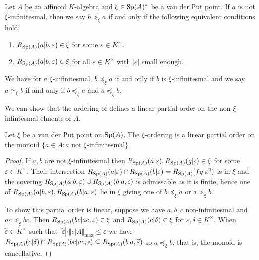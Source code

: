 \begin{definition}[$\xi$-Ordering]\label{def: xi-ordering}
    Let $A$ be an affinoid $K$-algebra and $\xi\in\mathrm{Sp}(A)^{*}$ be a van der Put point. If $a$ is not $\xi$-infinitesmal, then we say $b\preceq_{\xi}a$ if and only if the following equivalent conditions hold:
    \begin{enumerate}[label=(\roman*)]
        \item $R_{\mathrm{Sp}(A)}(a|b,\varepsilon)\in\xi$ for some $\varepsilon\in K^{\times}$. 
        \item $R_{\mathrm{Sp}(A)}(a|b,\varepsilon)\in\xi$ for all $\varepsilon\in K^{\times}$ with $|\varepsilon|$ small enough. 
    \end{enumerate}
\end{definition}
\begin{remark}
    We have for $a$ $\xi$-infinitesmal, $b\preceq_{\xi}a$ if and only if $b$ is $\xi$-infinitesmal and we say $a\simeq_{\xi}b$ if and only if $b\preceq_{\xi}a$ and $a\preceq_{\xi}b$. 
\end{remark}
We can show that the ordering of  defines a linear partial order on the non-$\xi$-infintesmal elments of $A$. 
\begin{proposition}\label{prop: xi-ordering is linear}
    Let $\xi$ be a van der Put point on $\mathrm{Sp}(A)$. The $\xi$-ordering is a linear partial order on the monoid $\{a\in A:a\text{ not }\xi\text{-infinitesmal}\}$. 
\end{proposition}
\begin{proof}
    If $a,b$ are not $\xi$-infinitesmal then $R_{\mathrm{Sp}(A)}(a|\varepsilon),R_{\mathrm{Sp}(A)}(g|\varepsilon)\in\xi$ for some $\varepsilon\in K^{\times}$. Their intersection $R_{\mathrm{Sp}(A)}(a|\varepsilon)\cap R_{\mathrm{Sp}(A)}(b|\varepsilon)=R_{\mathrm{Sp}(A)}(fg|\varepsilon^{2})$ is in $\xi$ and the covering $R_{\mathrm{Sp}(A)}(a|b,\varepsilon)\cup R_{\mathrm{Sp}(A)}(b|a,\varepsilon)$ is admissable as it is finite, hence one of $R_{\mathrm{Sp}(A)}(a|b,\varepsilon), R_{\mathrm{Sp}(A)}(b|a,\varepsilon)$ lie in $\xi$ giving one of $b\preceq_{\xi}a$ or $a\preceq_{\xi}b$. 

    To show this partial order is linear, suppose we have $a,b,c$ non-infinitesmal and $ac\preceq_{\xi}bc$. Then $R_{\mathrm{Sp}(A)}(bc|ac,\varepsilon)\in\xi$ and $R_{\mathrm{Sp}(A)}(c|\delta)\in\xi$ for $\varepsilon,\delta\in K^{\times}$. When $\widetilde{\varepsilon}\in K^{\times}$ such that $|\widetilde{\varepsilon}|\cdot\Vert c|A\Vert_{\max}\leq\varepsilon$ we have $R_{\mathrm{Sp}(A)}(c|\delta)\cap R_{\mathrm{Sp}(A)}(bc|ac,\epsilon)\subseteq R_{\mathrm{Sp}(A)}(b|a,\widetilde{\varepsilon})$ so $a\preceq_{\xi}b$, that is, the monoid is cancellative. 
\end{proof}
